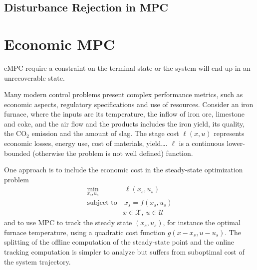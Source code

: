 \documentclass[11pt]{report}
\begin{document}
\subsection{Disturbance Rejection in MPC}
\label{sec:disturbance-rejection}



\section{Economic MPC}
\label{sec:economic-mpc}

eMPC require a constraint on the terminal state or the system will end up in an unrecoverable state.

Many modern control problems present complex performance metrics, such as economic aspects, regulatory specifications and use of resources. Consider an iron furnace, where the inputs are its temperature, the inflow of iron ore, limestone and coke, and the air flow and the products includes the iron yield, its quality, the CO$_2$ emission and the amount of slag. The stage cost $\ell(x,u)$ represents economic losses, energy use, cost of materials, yield\ldots. $\ell$ is a continuous lower-bounded (otherwise the problem is not well defined) function.

One approach is to include the economic cost in the steady-state optimization problem
\begin{align*}
  \min_{x_s,u_s} &\ \ell(x_s,u_s) \\
  \text{subject to} &\ x_s = f(x_s,u_s) \\
                 & x\in \mathcal{X},\ u\in \mathcal{U}
\end{align*}
and to use MPC to track the steady state $(x_s,u_s)$, for instance the optimal furnace temperature, using a quadratic cost function $g(x-x_s,u-u_s)$. The splitting of the offline computation of the steady-state point and the online tracking computation is simpler to analyze but suffers from suboptimal cost of the system trajectory.
\end{document}

